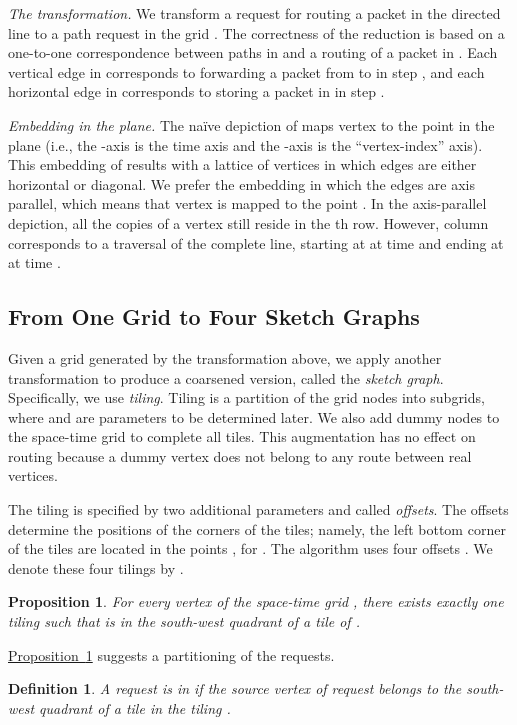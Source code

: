 \documentclass[11pt]{article}
\newtheorem{proposition}[theorem]{Proposition}
\newtheorem{definition}[theorem]{Definition}
\newcommand{\namedref}[2]{\hyperref[#2]{#1~\ref*{#2}}}
\newcommand{\propref}[1]{\namedref{Proposition}{#1}}
\newenvironment{proof sketch}[1]{\noindent {\emph{Proof sketch of #1:}}}{\hfill \qed}
\begin{document}
\emph{The transformation.} We transform a request
 for routing a packet in the directed
line  to a path request 
in the grid . The correctness of the reduction is
based on a one-to-one correspondence between paths in
 and a routing of a packet in . Each vertical
edge  in 
corresponds to forwarding a packet from  to 
in step , and each horizontal edge
 in  corresponds to
storing a packet in  in step .

\emph{Embedding in the plane.} The na\"ive depiction of
 maps vertex  to the point  in the
plane (i.e., the -axis is the time axis and the -axis
is the ``vertex-index'' axis). This embedding of 
results with a lattice of vertices in which edges are
either horizontal or diagonal.  We prefer the embedding in
which the edges are axis parallel, which means that vertex
 is mapped to the point .  In the
axis-parallel depiction, all the copies of a vertex  still reside in the th row. However, column 
corresponds to a traversal  of the complete line, starting
at  at time  and ending at  at time
.



\subsection{From One Grid to Four Sketch Graphs}\label{sec:sketch graph}
Given a grid generated by the transformation above, we apply another
transformation to produce a coarsened version, called the \emph{sketch
  graph}. Specifically, we use
\emph{tiling}. Tiling is a partition of the grid nodes into
  subgrids, where  and   are parameters to
 be determined later.  We also add dummy nodes to the space-time grid
 to complete all tiles.  This augmentation has no effect on
routing because a dummy vertex
does not belong to any route between real vertices.

The tiling is specified by two additional parameters  and  called
\emph{offsets}.  The offsets determine the positions of the corners of the tiles;
namely, the left bottom corner of the tiles are located in the points
, for . The algorithm
uses four offsets .  We
denote these four tilings by .

\begin{proposition}\label{prop:sw}
  For every vertex  of the space-time grid , there exists exactly one
  tiling  such that  is in the south-west quadrant of a tile of .
\end{proposition}
\noindent \propref{prop:sw} suggests a partitioning of the requests.
\begin{definition}
  A request  is in  if the source vertex  of request 
  belongs to the south-west quadrant of a tile in the tiling .
\end{definition}
\end{document}

